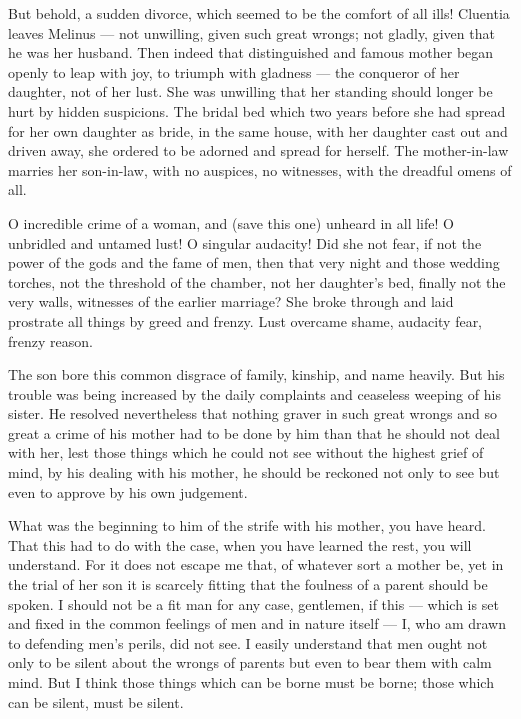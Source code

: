  But behold, a sudden divorce, which seemed to be the comfort of all ills! Cluentia leaves Melinus --- not unwilling, given such great wrongs; not gladly, given that he was her husband. Then indeed that distinguished and famous mother began openly to leap with joy, to triumph with gladness --- the conqueror of her daughter, not of her lust. She was unwilling that her standing should longer be hurt by hidden suspicions. The bridal bed which two years before she had spread for her own daughter as bride, in the same house, with her daughter cast out and driven away, she ordered to be adorned and spread for herself. The mother-in-law marries her son-in-law, with no auspices, no witnesses, with the dreadful omens of all.

 O incredible crime of a woman, and (save this one) unheard in all life! O unbridled and untamed lust! O singular audacity! Did she not fear, if not the power of the gods and the fame of men, then that very night and those wedding torches, not the threshold of the chamber, not her daughter's bed, finally not the very walls, witnesses of the earlier marriage? She broke through and laid prostrate all things by greed and frenzy. Lust overcame shame, audacity fear, frenzy reason.

 The son bore this common disgrace of family, kinship, and name heavily. But his trouble was being increased by the daily complaints and ceaseless weeping of his sister. He resolved nevertheless that nothing graver in such great wrongs and so great a crime of his mother had to be done by him than that he should not deal with her, lest those things which he could not see without the highest grief of mind, by his dealing with his mother, he should be reckoned not only to see but even to approve by his own judgement.

 What was the beginning to him of the strife with his mother, you have heard. That this had to do with the case, when you have learned the rest, you will understand. For it does not escape me that, of whatever sort a mother be, yet in the trial of her son it is scarcely fitting that the foulness of a parent should be spoken. I should not be a fit man for any case, gentlemen, if this --- which is set and fixed in the common feelings of men and in nature itself --- I, who am drawn to defending men's perils, did not see. I easily understand that men ought not only to be silent about the wrongs of parents but even to bear them with calm mind. But I think those things which can be borne must be borne; those which can be silent, must be silent.

